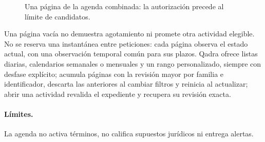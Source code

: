 \begin{figure}[!htbp]
  \centering
  
  \caption{Una página de la agenda combinada: la autorización precede al límite de candidatos.}
  \label{fig:impl-agenda-pagina}
\end{figure}

Una página vacía no demuestra agotamiento ni promete otra actividad elegible. No se reserva una instantánea entre peticiones: cada página observa el estado actual, con una observación temporal común para sus plazos. Qadra ofrece listas diarias, calendarios semanales o mensuales y un rango personalizado, siempre con desfase explícito; acumula páginas con la revisión mayor por familia e identificador, descarta las anteriores al cambiar filtros y reinicia al actualizar; abrir una actividad revalida el expediente y recupera su revisión exacta.

\paragraph{Límites.} La agenda no activa términos, no califica supuestos jurídicos ni entrega alertas.

